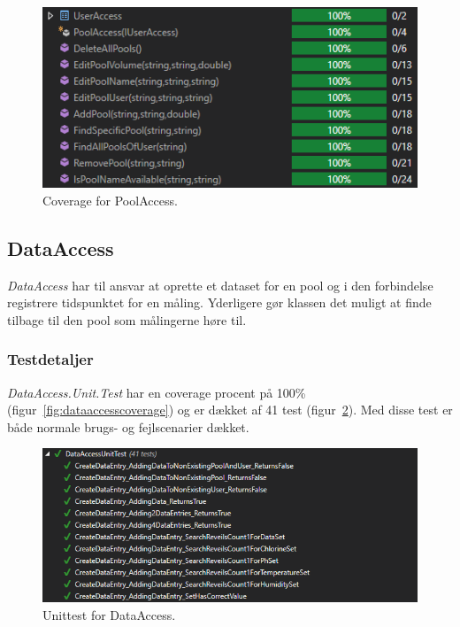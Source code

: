\begin{figure}[h]
	\centering
	\includegraphics[width=0.7\linewidth]{figs/test/poolaccesscoverage}
	\caption{Coverage for PoolAccess.}
	\label{fig:poolaccesscoverage}
\end{figure}

\subsection{DataAccess}
\textit{DataAccess} har til ansvar at oprette et dataset for en pool og i den forbindelse registrere tidspunktet for en måling. Yderligere gør klassen det muligt at finde tilbage til den pool som målingerne høre til.

\subsubsection{Testdetaljer}
\textit{DataAccess.Unit.Test} har en coverage procent på 100\% (figur~\ref{fig:dataaccesscoverage}) og er dækket af 41 test (figur~\ref{fig:dataaccessunittest}). Med disse test er både normale brugs- og fejlscenarier dækket.

\begin{figure}[h]
	\centering
	\includegraphics[width=0.9\linewidth]{figs/test/dataaccessunittest}
	\caption{Unittest for DataAccess.}
	\label{fig:dataaccessunittest}
\end{figure}

